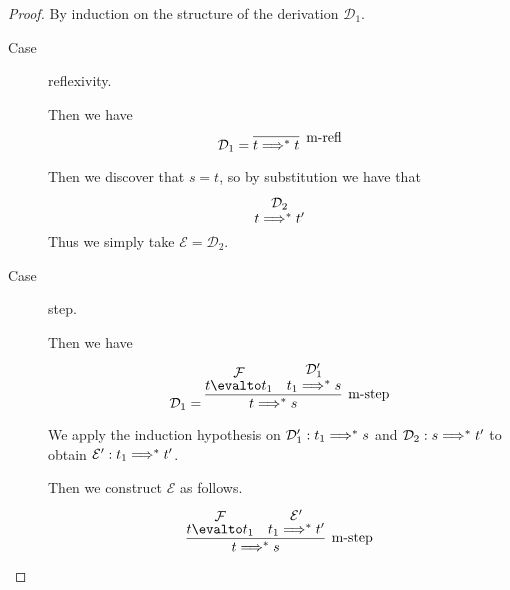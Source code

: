 \documentclass[11pt,letterpaper]{article}
\begin{document}
\begin{proof}
    By induction on the structure of the derivation $\mathcal{D}_1$.

    \begin{description}
        \item[Case] reflexivity.

            Then we have
            \begin{equation*}
                \mathcal{D}_1 = \infer[\text{m-refl}]{t \altevalto^* t}{}
            \end{equation*}

            Then we discover that $s = t$,
            so by substitution we have that
            \begin{equation*}
                \deduce[\mathcal{D}_2]{t \altevalto^* t^\prime}{}
            \end{equation*}
            Thus we simply take $\mathcal{E} = \mathcal{D}_2$.

        \item[Case] step.

            Then we have
            \begin{equation*}
                \mathcal{D}_1 = \infer[\text{m-step}]{
                    t \altevalto^* s
                }{
                    \deduce[\mathcal{F}]{t \evalto t_1}{}
                    &
                    \deduce[\mathcal{D}_1^\prime]{t_1 \altevalto^* s}{}
                }
            \end{equation*}

            We apply the induction hypothesis on
            $\mathcal{D}_1^\prime : t_1 \Longrightarrow^* s$
            and
            $\mathcal{D}_2 : s \Longrightarrow^* t^\prime$
            to obtain
            $\mathcal{E}^\prime : t_1 \Longrightarrow^* t^\prime$.

            Then we construct $\mathcal{E}$ as follows.
            \begin{equation*}
                \infer[\text{m-step}]{
                    t \altevalto^* s
                }{
                    \deduce[\mathcal{F}]{t \evalto t_1}{}
                    &
                    \deduce[\mathcal{E}^\prime]{t_1 \altevalto^* t^\prime}{}
                }
            \end{equation*}
    \end{description}
\end{proof}
\end{document}
